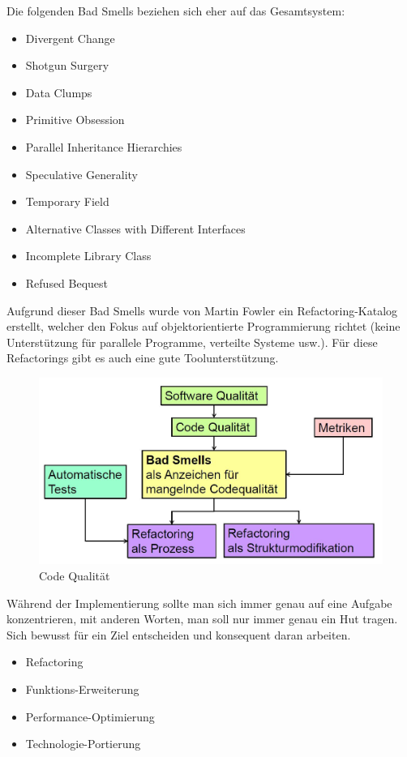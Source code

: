 Die folgenden Bad Smells beziehen sich eher auf das Gesamtsystem:
\begin{itemize}
	\item Divergent Change
	\item Shotgun Surgery
	\item Data Clumps
	\item Primitive Obsession
	\item Parallel Inheritance Hierarchies
	\item Speculative Generality
	\item Temporary Field
	\item Alternative Classes with Different Interfaces
	\item Incomplete Library Class
	\item Refused Bequest
\end{itemize}
Aufgrund dieser Bad Smells wurde von Martin Fowler ein Refactoring-Katalog erstellt, welcher den Fokus auf objektorientierte Programmierung richtet (keine Unterstützung für parallele Programme, verteilte Systeme usw.). Für diese Refactorings gibt es auch eine gute Toolunterstützung.



\begin{figure}
	\centering
	\includegraphics[width=0.7\linewidth]{fig/fazit-refactoring}
	\caption{Code Qualität}
	\label{fig:fazit-refactoring}
\end{figure}

Während der Implementierung sollte man sich immer genau auf eine Aufgabe konzentrieren, mit anderen Worten, man soll nur immer genau ein Hut tragen. Sich bewusst für ein Ziel entscheiden und konsequent daran arbeiten.

\begin{itemize}
	\item Refactoring
	\item Funktions-Erweiterung
	\item Performance-Optimierung
	\item Technologie-Portierung
\end{itemize}

